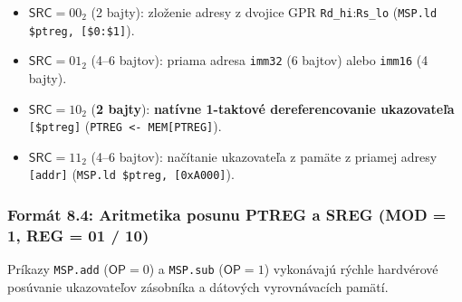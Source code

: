 \documentclass[11pt,a4paper]{article}
\newcommand{\reg}[1]{\texttt{#1}}
\newcommand{\field}[1]{\textsf{#1}}
\begin{document}
\begin{itemize}
  \item $\field{SRC} = 00_2$ (2 bajty): zloženie adresy z dvojice GPR \reg{Rd\_hi}:\reg{Rs\_lo} (\texttt{MSP.ld \$ptreg, [\$0:\$1]}).
  \item $\field{SRC} = 01_2$ (4--6 bajtov): priama adresa \texttt{imm32} (6 bajtov) alebo \texttt{imm16} (4 bajty).
  \item $\field{SRC} = 10_2$ (\textbf{2 bajty}): \textbf{natívne 1-taktové dereferencovanie ukazovateľa} \texttt{[\$ptreg]} (\texttt{PTREG <- MEM[PTREG]}).
  \item $\field{SRC} = 11_2$ (4--6 bajtov): načítanie ukazovateľa z pamäte z priamej adresy \texttt{[addr]} (\texttt{MSP.ld \$ptreg, [0xA000]}).
\end{itemize}

\subsubsection{Formát 8.4: Aritmetika posunu PTREG a SREG (MOD = 1, REG = 01 / 10)}
Príkazy \texttt{MSP.add} ($\field{OP}=0$) a \texttt{MSP.sub} ($\field{OP}=1$) vykonávajú rýchle hardvérové posúvanie ukazovateľov zásobníka a dátových vyrovnávacích pamätí.
\end{document}
